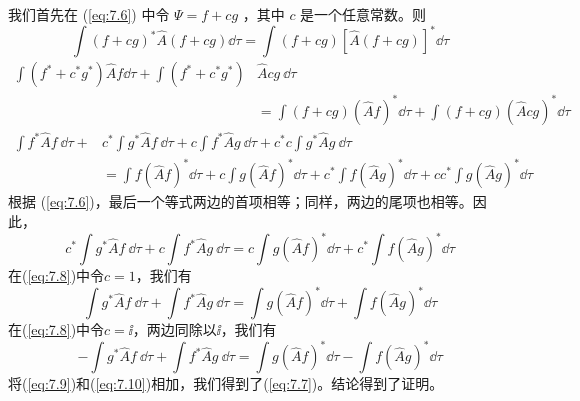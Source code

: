     我们首先在 (\ref{eq:7.6}) 中令 $ \Psi = f+cg$ ，其中 $c$ 是一个任意常数。则
    \begin{equation*}
        \int \left(f+cg\right)^{\ast}\hat{A}\left(f+cg\right)\dd \tau = \int \left(f+cg\right)\left[\hat{A}\left(f+cg\right)\right]^{\ast}\dd \tau
    \end{equation*}
    \begin{equation*}
        \begin{aligned}
            \int \left(f^{\ast}+c^{\ast}g^{\ast}\right)\hat{A}f\dd \tau + \int \left(f^{\ast} +c^{\ast}g^{\ast} \right)&\hat{A}cg \:\dd \tau \\
            & = \int \left(f+c g\right)\left(\hat{A}f\right)^{\ast} \dd \tau + \int \left(f+c g\right)\left(\hat{A}cg\right)^{\ast} \dd \tau
        \end{aligned}
    \end{equation*}
    \begin{equation*}
        \begin{aligned}
            \int f^{\ast} \hat{A} f \:\dd \tau + & c^{\ast} \int g^{\ast} \hat{A} f \:\dd \tau + c \int f^{\ast} \hat{A} g \:\dd \tau + c^{\ast}c \int g^{\ast} \hat{A} g \:\dd \tau  \\
            & =\int f \left(\hat{A}f\right)^{\ast} \dd \tau + c \int g \left(\hat{A}f\right)^{\ast} \dd \tau + c^{\ast} \int f \left(\hat{A}g\right)^{\ast} \dd \tau + cc^{\ast}\int g \left(\hat{A}g\right)^{\ast} \dd \tau
        \end{aligned}
    \end{equation*}
    根据 (\ref{eq:7.6})，最后一个等式两边的首项相等；同样，两边的尾项也相等。因此，
    \begin{equation}
        c^{\ast} \int g^{\ast} \hat{A} f \:\dd \tau + c \int f^{\ast} \hat{A} g \:\dd \tau = c \int g \left(\hat{A}f\right)^{\ast} \dd \tau + c^{\ast} \int f \left(\hat{A}g\right)^{\ast} \dd \tau
        \label{eq:7.8}
    \end{equation}
    在(\ref{eq:7.8})中令$c=1$，我们有
    \begin{equation}
        \int g^{\ast} \hat{A} f \:\dd \tau + \int f^{\ast} \hat{A} g \:\dd \tau = \int g \left(\hat{A}f\right)^{\ast} \dd \tau + \int f \left(\hat{A}g\right)^{\ast} \dd \tau
        \label{eq:7.9}
    \end{equation}
    在(\ref{eq:7.8})中令$c = \ii $，两边同除以$\ii $，我们有
    \begin{equation}
        - \int g^{\ast} \hat{A} f \:\dd \tau + \int f^{\ast} \hat{A} g \:\dd \tau = \int g \left(\hat{A}f\right)^{\ast} \dd \tau - \int f \left(\hat{A}g\right)^{\ast} \dd \tau
        \label{eq:7.10}
    \end{equation}
    将(\ref{eq:7.9})和(\ref{eq:7.10})相加，我们得到了(\ref{eq:7.7})。结论得到了证明。

